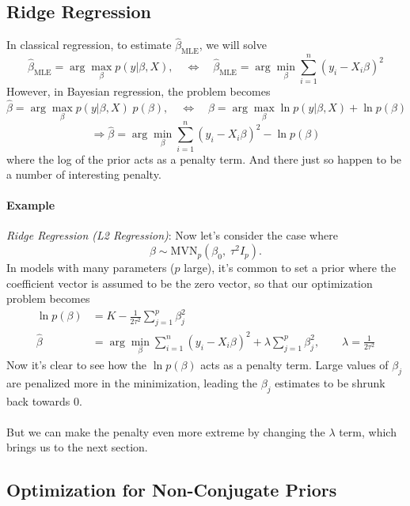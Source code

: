 \documentclass[12pt]{article}
\begin{document}
\newpage
\subsection{Ridge Regression}

In classical regression, to estimate $\hat{\beta}_{\text{MLE}}$,
we will solve
\[ \hat{\beta}_{\text{MLE}} = \arg \max_{\beta} p(y | \beta, X), 
   \quad \Leftrightarrow \quad \hat{\beta}_{\text{MLE}} = 
   \arg \min_{\beta} \sum^n_{i=1} (y_i - X_i \beta)^2 
   \]
However, in Bayesian regression, the problem becomes
\[ \hat{\beta}= \arg \max_{\beta} p(y | \beta, X)\;p(\beta),
   \quad \Leftrightarrow \quad \hat{\beta} = 
   \arg \max_{\beta} \ln p(y | \beta, X) + \ln p(\beta)
   \]
\[ \Rightarrow \hat{\beta} = \arg \min_\beta \sum^n_{i=1} 
   (y_i - X_i \beta)^2 - \ln p(\beta) \]
where the log of the prior acts as a penalty term. And there just so happen to be a number of interesting penalty.

\paragraph{Example} {\sl Ridge Regression (L2 Regression)}:
Now let's consider the case where 
   \[ \beta \sim \text{MVN}_p(\beta_0, \; \tau^2 I_p).\]
In models with many parameters ($p$ large), it's common to set a
prior where the coefficient vector is assumed to be the zero vector,
so that our optimization problem becomes
\begin{align*}
   \ln p(\beta) &= K - \frac{1}{2\tau^2} \sum^p_{j=1} \beta_j^2\\
   \hat{\beta} &= \arg \min_\beta \sum^n_{i=1} 
      (y_i - X_i \beta)^2 + \lambda  \sum^p_{j=1} \beta_j^2, \qquad
      \lambda = \frac{1}{2\tau^2}
\end{align*}
Now it's clear to see how the $\ln p(\beta)$ acts as a penalty term.
Large values of $\beta_j$ are penalized more in the minimization,
leading the $\beta_j$ estimates to be shrunk back towards 0. 
\\
\\
But we can make the penalty even more extreme by changing the 
$\lambda$ term, which brings us to the next section.

\subsection{Optimization for Non-Conjugate Priors}
\end{document}
